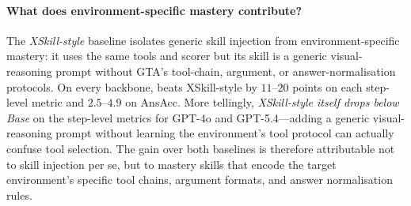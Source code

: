 \paragraph{What does environment-specific mastery contribute?}
The \emph{XSkill-style} baseline isolates generic skill injection from environment-specific
mastery: it uses the same tools and scorer but its skill is a generic visual-reasoning
prompt without GTA's tool-chain, argument, or answer-normalisation protocols. On every
backbone, \sysname{} beats XSkill-style by $11$--$20$ points on each step-level metric and
$2.5$--$4.9$ on AnsAcc. More tellingly, \emph{XSkill-style itself drops below Base} on the
step-level metrics for GPT-4o and GPT-5.4---adding a generic visual-reasoning prompt
without learning the environment's tool protocol can actually confuse tool selection. The
gain over both baselines is therefore attributable not to skill injection per se, but to
mastery skills that encode the target environment's specific tool chains, argument
formats, and answer normalisation rules.


